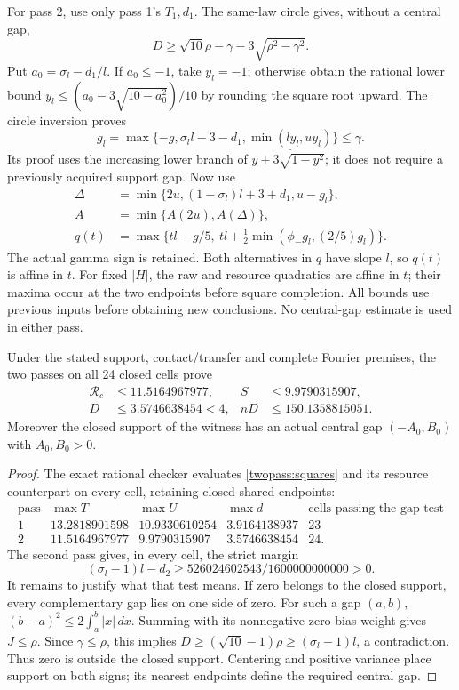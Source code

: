 For pass 2, use only pass 1's $T_1,d_1$. The same-law circle gives,
without a central gap,
\[
 D\ge\sqrt{10}\rho-\gamma-3\sqrt{\rho^2-\gamma^2}.
\]
Put $a_0=\sigma_l-d_1/l$. If $a_0\le-1$, take $y_l=-1$;
otherwise obtain the rational lower bound
$y_l\le(a_0-3\sqrt{10-a_0^2})/10$ by rounding the square root upward.
The circle inversion proves
\[
 g_l=\max\{-g,\sigma_l l-3-d_1,\underline{\min(ly_l,uy_l)}\}\le\gamma.
\]
Its proof uses the increasing lower branch of
$y+3\sqrt{1-y^2}$; it does not require a previously acquired support gap.
Now use
\begin{align*}
 \Delta&=\min\{2u,(1-\sigma_l)l+3+d_1,u-g_l\},\\
 A&=\min\{A(2u),A(\Delta)\},\\
 q(t)&=\max\{tl-g/5,\ tl+\tfrac12\min(\phi_-g_l,(2/5)g_l)\}.
\end{align*}
The actual gamma sign is retained. Both alternatives in $q$ have slope
$l$, so $q(t)$ is affine in $t$. For fixed $|H|$, the raw and resource
quadratics are affine in $t$; their maxima occur at the two endpoints
before square completion. All bounds use previous inputs before obtaining
new conclusions. No central-gap estimate is used in either pass.

\begin{theorem}\label{twopass:result}
Under the stated support, contact/transfer and complete Fourier premises,
the two passes on all 24 closed cells prove
\begin{align*}
 \mathcal R_c&\le11.5164967977, & S&\le9.9790315907,\\
 D&\le3.5746638454<4, & nD&\le150.1358815051.
\end{align*}
Moreover the closed support of the witness has an actual central gap
$(-A_0,B_0)$ with $A_0,B_0>0$.
\end{theorem}
\begin{proof}
The exact rational checker evaluates \eqref{twopass:squares} and its
resource counterpart on every cell, retaining closed shared endpoints:
\[
\begin{array}{c|r|r|r|c}
 \text{pass}&\max T&\max U&\max d&\text{cells passing the gap test}\\\hline
 1&13.2818901598&10.9330610254&3.9164138937&23\\
 2&11.5164967977&9.9790315907&3.5746638454&24.
\end{array}
\]
The second pass gives, in every cell, the strict margin
\[
 (\sigma_l-1)l-d_2\ge
 526024602543/1600000000000>0.
\]
It remains to justify what that test means. If zero belongs to the
closed support, every complementary gap lies on one side of zero.
For such a gap $(a,b)$,
$(b-a)^2\le2\int_a^b|x|\,dx$.
Summing with its nonnegative zero-bias weight gives $J\le\rho$.
Since $\gamma\le\rho$, this implies
$D\ge(\sqrt{10}-1)\rho\ge(\sigma_l-1)l$, a contradiction.
Thus zero is outside the closed support. Centering and positive variance
place support on both signs; its nearest endpoints define the required
central gap.
\end{proof}

